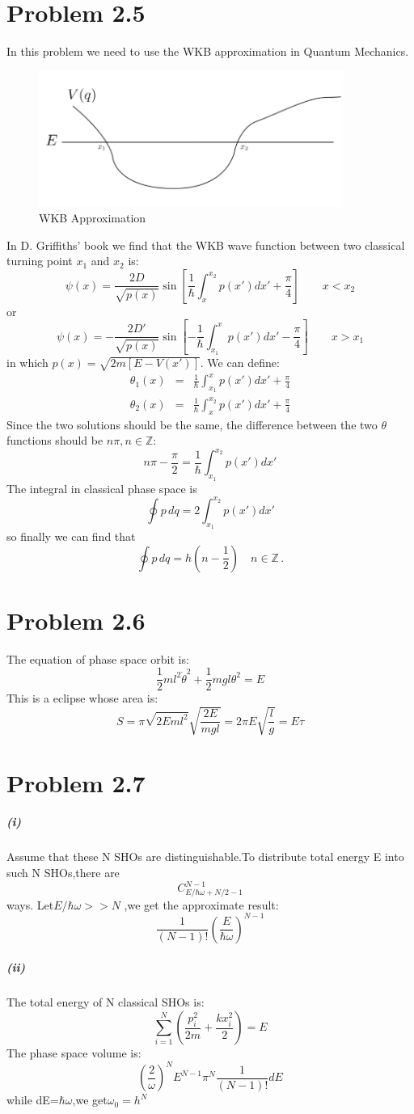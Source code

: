 \documentclass{article}
\begin{document}
\section*{Problem 2.5}
In this problem we need to use the WKB approximation in Quantum Mechanics. 
\begin{figure}[!htp]
\centering
\includegraphics[width=10cm]{./figures/2.3-2.5/pic1.png}
\caption{WKB Approximation}
\end{figure}
In D. Griffiths' book we find that the WKB wave function between two classical turning point $x_1$ and $x_2$ is:
$$
\psi(x) = \frac{2D}{\sqrt{p(x)}}\sin\left[\frac{1}{\hbar}\int_x^{x_2}p(x')dx' + \frac{\pi}{4}\right]\quad\quad x< x_2
$$
or
$$
\psi(x) = -\frac{2D'}{\sqrt{p(x)}}\sin\left[-\frac{1}{\hbar}\int_{x_1}^{x}p(x')dx'-\frac{\pi}{4}\right]\quad\quad x>x_1
$$
in which $p(x) = \sqrt{2m[E-V(x')]}$. We can define:
\begin{eqnarray*}
\theta_1(x) &=& \frac{1}{\hbar}\int_{x_1}^{x}p(x')dx'+\frac{\pi}{4}\\
\theta_2(x) &=& \frac{1}{\hbar}\int_x^{x_2}p(x')dx' + \frac{\pi}{4}
\end{eqnarray*}
Since the two solutions should be the same, the difference between the two $\theta$ functions should be $n\pi, n\in\mathbb{Z}$: 
\begin{equation}
n\pi-\frac{\pi}{2} = \frac{1}{\hbar}\int_{x_1}^{x_2}p(x')dx'
\end{equation}
The integral in classical phase space is
$$
\oint p\,dq = 2 \int_{x_1}^{x_2}p(x')dx'
$$
so finally we can find that 
\begin{equation}
\oint p\,dq = h\left(n-\frac{1}{2}\right)\quad n\in\mathbb{Z}\,.
\end{equation}
\section*{Problem 2.6}
The equation of phase space orbit is:
$$
\frac{1}{2}ml^{2}\dot{\theta}^{2}+\frac{1}{2}mgl\theta^{2}=E
$$
This is a eclipse whose area is:
$$
S=\pi \sqrt{2Eml^{2}}\sqrt{\frac{2E}{mgl}}=2\pi E \sqrt{\frac{l}{g}}=E \tau
$$
\section*{Problem 2.7}
\subparagraph{(i)}
Assume that these N SHOs are distinguishable.To distribute total energy E into such N SHOs,\quad there are 
$$C_{E/\hbar \omega+N/2-1}^{N-1}$$ways. \quad 
Let\quad $E/\hbar \omega >>N$ ,we get the approximate result: 
$$
\frac{1}{(N-1)!} (\frac{E}{\hbar \omega} )^{N-1}
$$
\subparagraph{(ii)}
The total energy of N classical SHOs is:
$$\sum_{i=1}^{N}(\frac{p_i^2}{2m}+\frac{k x_i ^2}{2})=E$$
The phase space volume is:
$$(\frac{2}{\omega})^N E^{N-1} \pi ^N \frac{1}{(N-1)!} dE$$
while dE=$\hbar \omega$,\quad we get\quad $\omega_0=h^N$
\end{document}
